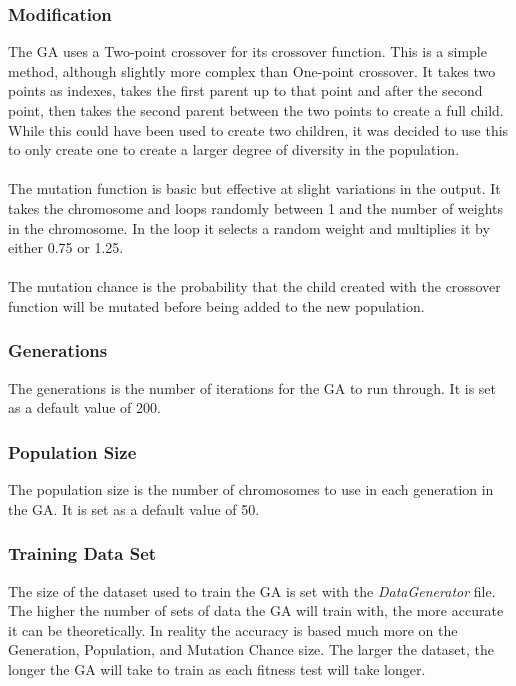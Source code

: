 \documentclass[12pt]{article}
\begin{document}
\subsubsection{Modification}
The GA uses a Two-point crossover for its crossover function. This is a simple method, although slightly more complex than One-point crossover. It takes two points as indexes, takes the first parent up to that point and after the second point, then takes the second parent between the two points to create a full child. While this could have been used to create two children, it was decided to use this to only create one to create a larger degree of diversity in the population.\\\\
The mutation function is basic but effective at slight variations in the output. It takes the chromosome and loops randomly between 1 and the number of weights in the chromosome. In the loop it selects a random weight and multiplies it by either 0.75 or 1.25. \\\\
The mutation chance is the probability that the child created with the crossover function will be mutated before being added to the new population.

\subsubsection{Generations}
The generations is the number of iterations for the GA to run through. It is set as a default value of 200.

\subsubsection{Population Size}
The population size is the number of chromosomes to use in each generation in the GA. It is set as a default value of 50.

\subsubsection{Training Data Set}
The size of the dataset used to train the GA is set with the \textit{DataGenerator} file. The higher the number of sets of data the GA will train with, the more accurate it can be theoretically. In reality the accuracy is based much more on the Generation, Population, and Mutation Chance size. The larger the dataset, the longer the GA will take to train as each fitness test will take longer.
\end{document}
